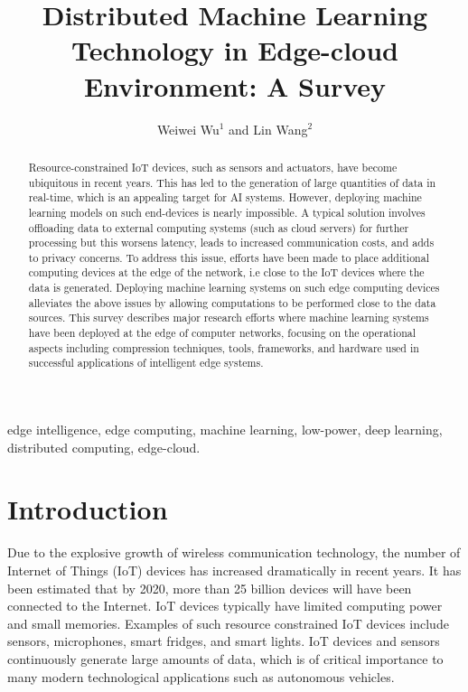 \documentclass[letterpaper, 10 pt, conference]{ieeeconf}
\title{\LARGE \bf Distributed Machine Learning Technology in Edge-cloud Environment: A Survey }
\author{Weiwei Wu$^{1}$ and Lin Wang$^{2}$}
\begin{document}
\maketitle
\thispagestyle{empty}
\pagestyle{empty}
\begin{abstract}
Resource-constrained IoT devices, such as sensors and actuators, have become ubiquitous in recent years. This has led to the generation of large quantities of data in real-time, which is an appealing target for AI systems. However, deploying machine learning models on such end-devices is nearly impossible. A typical solution involves offloading data to external computing systems (such as cloud servers) for further processing but this worsens latency, leads to increased communication costs, and adds to privacy concerns. To address this issue, efforts have been made to place additional computing devices at the edge of the network, i.e close to the IoT devices where the data is generated. Deploying machine learning systems on such edge computing devices alleviates the above issues by allowing computations to be performed close to the data sources. This survey describes major research efforts where machine learning systems have been deployed at the edge of computer networks, focusing on the operational aspects including compression techniques, tools, frameworks, and hardware used in successful applications of intelligent edge systems.
\end{abstract}
\begin{keywords}
edge intelligence, edge computing, machine learning, low-power, deep learning, distributed computing, edge-cloud.
\end{keywords}

\section{Introduction}
Due to the explosive growth of wireless communication technology, the number of Internet of Things (IoT) devices has increased dramatically in recent years. It has been estimated that by 2020, more than 25 billion devices will have been connected to the Internet\cite{mahdavinejad_machine_2018}. IoT devices typically have limited computing power and small memories. Examples of such resource constrained IoT devices include sensors, microphones, smart fridges, and smart lights. IoT devices and sensors continuously generate large amounts of data, which is of critical importance to many modern technological applications such as autonomous vehicles.
\end{document}
